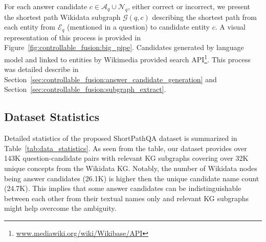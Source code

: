 For each answer candidate $c \in \mathcal{A}_q \cup \mathcal{N}_q$, either correct or incorrect, we present the shortest path Wikidata subgraph $\mathcal{G}(q, c)$ describing the shortest path from each entity from $\mathcal{E}_q$ (mentioned in a question) to candidate entity $c$. A visual representation of this process is provided in Figure~\ref{fig:controllable_fusion:big_pipe}. Candidates generated by language model and linked to entities by Wikimedia provided search API\footnote{\href{https://www.mediawiki.org/wiki/Wikibase/API}{www.mediawiki.org/wiki/Wikibase/API}}. This process was detailed describe in Section~\ref{sec:controllable_fusion:answer_candidate_generation} and Section~\ref{sec:controllable_fusion:subgraph_extract}.


\subsection{Dataset Statistics}

Detailed statistics of the proposed ShortPathQA dataset is summarized in Table~\ref{tab:data_statistics}. As seen from the table, our dataset provides over 143K question-candidate pairs with relevant KG subgraphs covering over 32K unique concepts from the Wikidata KG. Notably, the number of Wikidata nodes being answer candidates (26.1K) is higher then the unique candidate name count (24.7K). This implies that some answer candidates can be indistinguishable between each other from their textual names only and relevant KG subgraphs might help overcome the ambiguity.


